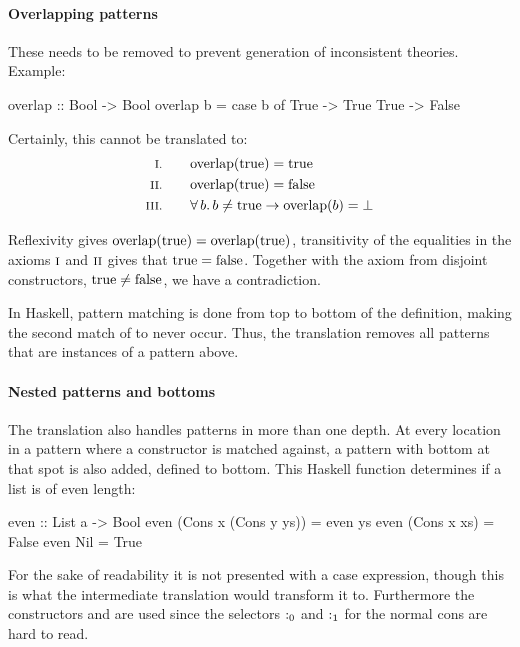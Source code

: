 \paragraph{Overlapping patterns} These needs to be removed to prevent
generation of inconsistent theories. Example:

\begin{code}
overlap :: Bool -> Bool
overlap b = case b of
              True -> True
              True -> False
\end{code}

Certainly, this cannot be translated to:
\begin{align*}
\rom{1} \qquad & \fn{overlap}(\fn{true}) = \fn{true} \\
\rom{2} \qquad & \fn{overlap}(\fn{true}) = \fn{false} \\
\rom{3} \qquad & \fa{b} b \neq \fn{true} \rightarrow \fn{overlap}(b) = \bot
\end{align*}

Reflexivity gives $\mathrm{overlap}(\mathrm{true}) = \mathrm{overlap}(\mathrm{true})$,
transitivity of the equalities in the axioms $\romnodot{1}$ and
$\romnodot{2}$ gives that $\mathrm{true} = \mathrm{false}$. Together with the
axiom from disjoint constructors, $\mathrm{true} \neq \mathrm{false}$, we have
a contradiction.

In Haskell, pattern matching is done from top to bottom of the
definition, making the second match of  to never occur. Thus,
the translation removes all patterns that are instances of a pattern
above.



\paragraph{Nested patterns and bottoms} The translation also handles
patterns in more than one depth. At every location in a pattern where
a constructor is matched against, a pattern with bottom at that spot
is also added, defined to bottom. This Haskell function 
determines if a list is of even length:

\begin{code}
even :: List a -> Bool
even (Cons x (Cons y ys)) = even ys
even (Cons x xs)          = False
even Nil                  = True
\end{code}

\noindent
For the sake of readability it is not presented with a case
expression, though this is what the intermediate translation would
transform it to. Furthermore the constructors  and 
are used since the selectors $\mathrm{:_0}$ and $\mathrm{:_1}$ for the
normal cons are hard to read.

